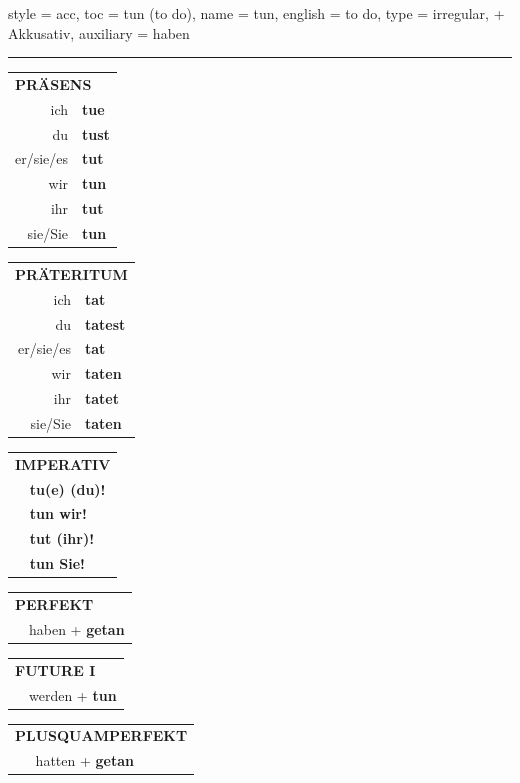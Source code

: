 \begin{verbentry}{
  style = {acc},
  toc = {tun (to do)},
  name = {tun},
  english = {to do},
  type = {irregular, + Akkusativ},
  auxiliary = {haben}
}


\vspace{5pt}
\hrule
\vspace{5pt}

\begin{tabular}{rl}
\multicolumn{2}{l}{\textbf{PRÄSENS}}\\
ich & \textbf{tue}\\
du & \textbf{tust}\\
er/sie/es & \textbf{tut}\\
wir & \textbf{tun}\\
ihr & \textbf{tut}\\
sie/Sie & \textbf{tun}\\
\end{tabular}
\hfill
\begin{tabular}{rl}
\multicolumn{2}{l}{\textbf{PRÄTERITUM}}\\
ich & \textbf{tat}\\
du & \textbf{tatest}\\
er/sie/es & \textbf{tat}\\
wir & \textbf{taten}\\
ihr & \textbf{tatet}\\
sie/Sie & \textbf{taten}\\
\end{tabular}
\hfill
\begin{tabular}{rl}
\multicolumn{2}{l}{\textbf{IMPERATIV}}\\
& \textbf{tu(e) (du)!}\\
& \textbf{tun wir!}\\
& \textbf{tut (ihr)!}\\
& \textbf{tun Sie!}\\
\end{tabular}

\vspace{10pt}

\begin{tabular}{rl}
\multicolumn{2}{l}{\textbf{PERFEKT}}\\
& haben + \textbf{getan}\\
\end{tabular}
\hfill
\begin{tabular}{rl}
\multicolumn{2}{l}{\textbf{FUTURE I}}\\
& werden + \textbf{tun}\\
\end{tabular}
\hfill
\begin{tabular}{rl}
\multicolumn{2}{l}{\textbf{PLUSQUAMPERFEKT}}\\
& hatten + \textbf{getan}\\
\end{tabular}


\end{verbentry}
